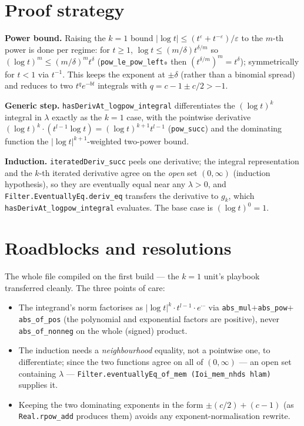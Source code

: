 \documentclass[11pt]{article}
\begin{document}
\section{Proof strategy}
\textbf{Power bound.} Raising the $k=1$ bound $|\log t|\le(t^{\varepsilon}+t^{-\varepsilon})/\varepsilon$
to the $m$-th power is done per regime: for $t\ge1$, $\log t\le(m/\delta)t^{\delta/m}$ so
$(\log t)^m\le(m/\delta)^m t^{\delta}$ (\texttt{pow\_le\_pow\_left₀} then
$(t^{\delta/m})^m=t^\delta$); symmetrically for $t<1$ via $t^{-1}$. This keeps the exponent at $\pm\delta$
(rather than a binomial spread) and reduces to two $t^q e^{-bt}$ integrals with $q=c-1\pm c/2>-1$.

\textbf{Generic step.} \texttt{hasDerivAt\_logpow\_integral} differentiates the $(\log t)^k$ integral in
$\lambda$ exactly as the $k=1$ case, with the pointwise derivative $(\log t)^k\cdot(t^{l-1}\log t)=
(\log t)^{k+1}t^{l-1}$ (\texttt{pow\_succ}) and the dominating function the $|\log t|^{k+1}$-weighted
two-power bound.

\textbf{Induction.} \texttt{iteratedDeriv\_succ} peels one derivative; the integral representation and the
$k$-th iterated derivative agree on the \emph{open} set $(0,\infty)$ (induction hypothesis), so they are
eventually equal near any $\lambda>0$, and \texttt{Filter.EventuallyEq.deriv\_eq} transfers the derivative
to $g_k$, which \texttt{hasDerivAt\_logpow\_integral} evaluates. The base case is $(\log t)^0=1$.

\section{Roadblocks and resolutions}
The whole file compiled on the first build --- the $k=1$ unit's playbook transferred cleanly. The three
points of care:
\begin{itemize}
\item The integrand's norm factorises as $|\log t|^k\cdot t^{l-1}\cdot e^{\cdots}$ via
\texttt{abs\_mul}$+$\texttt{abs\_pow}$+$\texttt{abs\_of\_pos} (the polynomial and exponential factors are
positive), never \texttt{abs\_of\_nonneg} on the whole (signed) product.
\item The induction needs a \emph{neighbourhood} equality, not a pointwise one, to differentiate; since
the two functions agree on all of $(0,\infty)$ --- an open set containing $\lambda$ --- \texttt{Filter.eventuallyEq\_of\_mem
(Ioi\_mem\_nhds hlam)} supplies it.
\item Keeping the two dominating exponents in the form $\pm(c/2)+(c-1)$ (as \texttt{Real.rpow\_add}
produces them) avoids any exponent-normalisation rewrite.
\end{itemize}
\end{document}
